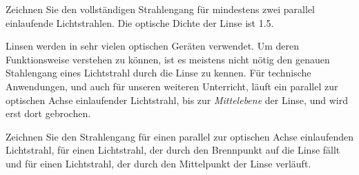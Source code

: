 \documentclass[paper=a4,twoside=true,,DIV13,BCOR1cm]{scrartcl}
\begin{document}
\begin{aufgabe}
Zeichnen Sie den vollständigen Strahlengang für mindestens zwei parallel einlaufende Lichtstrahlen.
Die optische Dichte der Linse ist \num{1.5}.
\end{aufgabe}

\begin{center}
\end{center}


Linsen werden in sehr vielen optischen Geräten verwendet. Um deren Funktionsweise verstehen zu können, ist es meistens nicht
nötig den genauen Stahlengang eines Lichtstrahl durch die Linse zu kennen. Für technische Anwendungen, und auch für unseren weiteren
Unterricht, läuft ein parallel zur optischen Achse einlaufender Lichtstrahl, bis zur \emph{Mittelebene} der Linse, und wird erst dort gebrochen.

\begin{aufgabe}
	Zeichnen Sie den Strahlengang für einen parallel zur optischen Achse einlaufenden Lichtstrahl, für einen Lichtstrahl, der durch
	den Brennpunkt auf die Linse fällt und für einen Lichtstrahl, der durch den Mittelpunkt der Linse verläuft.
\end{aufgabe}

\begin{center}
\end{center}
\end{document}
